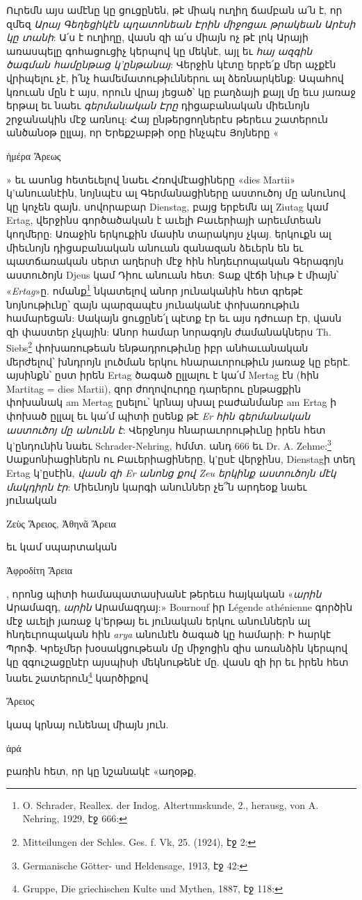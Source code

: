 \documentclass{article}
\begin{document}
{Ուրեմն այս ամէնը կը ցուցընեն, թէ միակ ուղիղ ճամբան ա՛ն է, որ զմեզ \emph{Արայ Գեղեցիկէն պղատոնեան Էրին միջոցաւ թրակեան Արէսի կը տանի}: Ա՛ս է ուղիղը, վասն զի ա՛ս միայն ոչ թէ լոկ Արայի առասպելը գոհացուցիչ կերպով կը մեկնէ, այլ եւ \emph{հայ ազգին ծագման համընթաց կ'ընթանայ}: Վերջին կէտը երբե՛ք մեր աչքէն վրիպելու չէ, ի՛նչ համեմատութիւններու ալ ձեռնարկենք: Ապահով կռուան մըն է այս, որուն վրայ յեցած՝ կը բաղձայի քայլ մը եւս յառաջ երթալ եւ նաեւ \emph{գերմանական Էրը} դիցաբանական միեւնոյն շրջանակին մէջ առնուլ: Հայ ընթերցողներէս թերեւս շատերուն անծանօթ ըլլայ, որ Երեքշաբթի օրը ինչպէս Յոյները «\begin{greek}ἡμέρα Ἄρεως\end{greek}» եւ ասոնց հետեւելով նաեւ Հռովմէացիները «dies Martii» կ'անուանէին, նոյնպէս ալ Գերմանացիները աստուծոյ մը անունով կը կոչեն զայն. սովորաբար Dienstag, բայց երբեմն ալ Ziutag կամ Ertag, վերջինս գործածական է աւելի Բաւերիայի արեւմտեան կողմերը: Առաջին երկուքին մասին տարակոյս չկայ. երկուքն ալ միեւնոյն դիցաբանական անուան զանազան ձեւերն են եւ պատճառական սերտ աղերսի մէջ հին հնդեւրոպական Գերագոյն աստուծոյն Djeus կամ Դիու անուան հետ: Տաք վէճի նիւթ է միայն՝ «\emph{Ertag}»ը. ոմանք\footnote{O. Schrader, Reallex. der Indog. Altertumskunde, 2., herausg, von A. Nehring, 1929, էջ 666:} նկատելով անոր յունականին հետ գրեթէ նոյնութիւնը՝ զայն պարզապէս յունականէ փոխառութիւն համարեցան: Սակայն ցուցընե՛լ պէտք էր եւ այս դժուար էր, վասն զի փաստեր չկային: Անոր համար նորագոյն ժամանակներս Th. Siebs\footnote{Mitteilungen der Schles. Ges. f. Vk, 25. (1924), էջ 2:} փոխառութեան ենթադրութիւնը իբր անհաւանական մերժելով՝ խնդրոյն լուծման երկու հնարաւորութիւն յառաջ կը բերէ. այսինքն՝ ըստ իրեն Ertag ծագած ըլլալու է կա՛մ Mertag էն (հին Martitag = dies Martii), զոր ժողովուրդը դարերու ընթացքին փոխանակ am Mertag ըսելու՝ կրնայ սխալ բաժանմանբ am Ertag ի փոխած ըլլալ եւ կա՛մ պիտի ըսենք թէ \emph{Er հին գերմանական աստուծոյ մը անունն է}: Վերջնոյս հնարաւորութիւնը իրեն հետ կ'ընդունին նաեւ Schrader-Nehring, հմմտ. անդ 666 եւ Dr. A. Zehme:\footnote{Germanische Götter- und Heldensage, 1913, էջ 42:} Սաքսոնիացիներն ու Բաւերիացիները, կ'ըսէ վերջինս, Dienstagի տեղ Ertag կ'ըսէին, \emph{վասն զի Er անոնց քով Zeu երկինք աստուծոյն մէկ մակդիրն էր}: Միեւնոյն կարգի անուններ չե՞ն արդեօք նաեւ յունական \begin{greek}Ζεὺς Ἄρειος, Ἀθηνᾶ Ἄρεια\end{greek} եւ կամ սպարտական \begin{greek}Ἀφροδίτη Ἄρεια\end{greek}, որոնց պիտի համապատասխանէ թերեւս հայկական «\emph{արին} Արամազդ, \emph{արին} Արամազդայ:» Bournouf իր Légende athénienne գործին մէջ աւելի յառաջ կ'երթայ եւ յունական երկու անուններն ալ հնդեւրոպական հին \emph{arya} անունէն ծագած կը համարի: Ի հարկէ Պրոֆ. Կրեչմեր խօսակցութեան մը միջոցին զիս առանձին կերպով կը զգուշացընէր այսպիսի մեկնութենէ մը. վասն զի իր եւ իրեն հետ նաեւ շատերուն\footnote{Gruppe, Die griechischen Kulte und Mythen, 1887, էջ 118:} կարծիքով \begin{greek}Ἄρειος\end{greek} կապ կրնայ ունենալ միայն յուն. \begin{greek}ἀρά\end{greek} բառին հետ, որ կը նշանակէ «աղօթք, }
\end{document}
